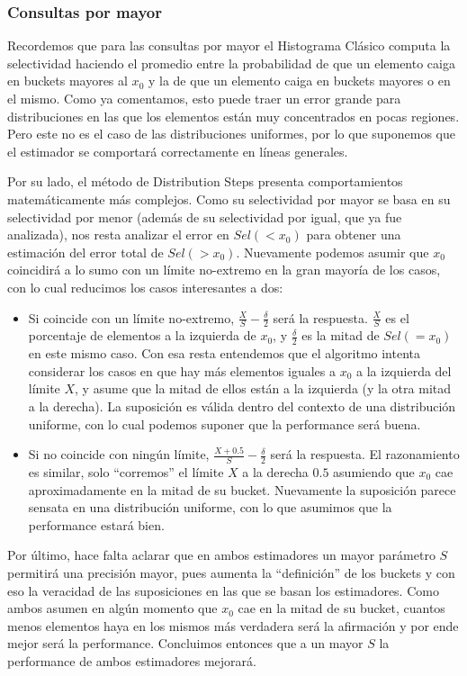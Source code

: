 \subsubsection{Consultas por mayor}
Recordemos que para las consultas por mayor el Histograma Clásico computa la selectividad haciendo el promedio entre la probabilidad de que un elemento caiga en buckets mayores al $x_0$ y la de que un elemento caiga en buckets mayores o en el mismo. Como ya comentamos, esto puede traer un error grande para distribuciones en las que los elementos están muy concentrados en pocas regiones. Pero este no es el caso de las distribuciones uniformes, por lo que suponemos que el estimador se comportará correctamente en líneas generales.

Por su lado, el método de Distribution Steps presenta comportamientos matemáticamente más complejos. Como su selectividad por mayor se basa en su selectividad por menor (además de su selectividad por igual, que ya fue analizada), nos resta analizar el error en $Sel(<x_0)$ para obtener una estimación del error total de $Sel(>x_0)$. Nuevamente podemos asumir que $x_0$ coincidirá a lo sumo con un límite no-extremo en la gran mayoría de los casos, con lo cual reducimos los casos interesantes a dos:
\begin{itemize}
 \item Si coincide con un límite no-extremo, $\frac{X}{S} - \frac{\delta}{2}$ será la respuesta. $\frac{X}{S}$ es el porcentaje de elementos a la izquierda de $x_0$, y $\frac{\delta}{2}$ es la mitad de $Sel(=x_0)$ en este mismo caso. Con esa resta entendemos que el algoritmo intenta considerar los casos en que hay más elementos iguales a $x_0$ a la izquierda del límite $X$, y asume que la mitad de ellos están a la izquierda (y la otra mitad a la derecha). La suposición es válida dentro del contexto de una distribución uniforme, con lo cual podemos suponer que la performance será buena.
 \item Si no coincide con ningún límite, $\frac{X+0.5}{S} - \frac{\delta}{2}$ será la respuesta. El razonamiento es similar, solo ``corremos'' el límite $X$ a la derecha $0.5$ asumiendo que $x_0$ cae aproximadamente en la mitad de su bucket. Nuevamente la suposición parece sensata en una distribución uniforme, con lo que asumimos que la performance estará bien.
\end{itemize}

Por último, hace falta aclarar que en ambos estimadores un mayor parámetro $S$ permitirá una precisión mayor, pues aumenta la ``definición'' de los buckets y con eso la veracidad de las suposiciones en las que se basan los estimadores. Como ambos asumen en algún momento que $x_0$ cae en la mitad de su bucket, cuantos menos elementos haya en los mismos más verdadera será la afirmación y por ende mejor será la performance. Concluimos entonces que a un mayor $S$ la performance de ambos estimadores mejorará.

